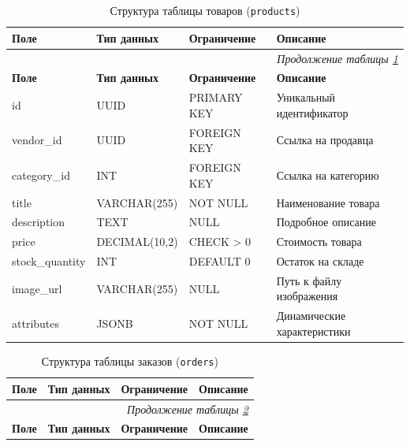 {%
\begin{longtable}{|p{3.2cm}|p{3cm}|p{3.5cm}|p{5.3cm}|}
	\caption{Структура таблицы товаров (\texttt{products})} \label{tab:db_products} \\
	\hline
	\textbf{Поле} & \textbf{Тип данных} & \textbf{Ограничение} & \textbf{Описание} \\ \hline
	\endfirsthead

	\multicolumn{4}{r}{\textit{Продолжение таблицы \ref{tab:db_products}}} \\
	\hline
	\textbf{Поле} & \textbf{Тип данных} & \textbf{Ограничение} & \textbf{Описание} \\ \hline
	\endhead

	\hline
	\endfoot

	\hline
	\endlastfoot

	id & UUID & PRIMARY KEY & Уникальный идентификатор \\ \hline
	vendor\_id & UUID & FOREIGN KEY & Ссылка на продавца \\ \hline
	category\_id & INT & FOREIGN KEY & Ссылка на категорию \\ \hline
	title & VARCHAR(255) & NOT NULL & Наименование товара \\ \hline
	description & TEXT & NULL & Подробное описание \\ \hline
	price & DECIMAL(10,2) & CHECK > 0 & Стоимость товара \\ \hline
	stock\_quantity & INT & DEFAULT 0 & Остаток на складе \\ \hline
	image\_url & VARCHAR(255) & NULL & Путь к файлу изображения \\ \hline
	attributes & JSONB & NOT NULL & Динамические характеристики \\ \hline
\end{longtable}

\begin{longtable}{|p{3.2cm}|p{3cm}|p{3.5cm}|p{5.3cm}|}
	\caption{Структура таблицы заказов (\texttt{orders})} \label{tab:db_orders} \\
	\hline
	\textbf{Поле} & \textbf{Тип данных} & \textbf{Ограничение} & \textbf{Описание} \\ \hline
	\endfirsthead

	\multicolumn{4}{r}{\textit{Продолжение таблицы \ref{tab:db_orders}}} \\
	\hline
	\textbf{Поле} & \textbf{Тип данных} & \textbf{Ограничение} & \textbf{Описание} \\ \hline
	\endhead


\end{longtable}}
